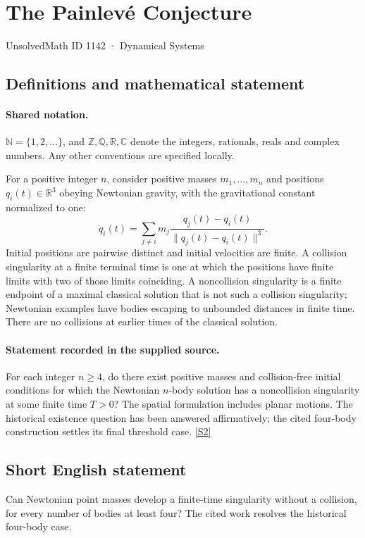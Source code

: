 \documentclass[11pt]{article}
\newcommand{\sref}[2]{\hyperlink{source:#1:#2}{[S#2]}}
\begin{document}
\setcounter{section}{1141}
\section{The Painlevé Conjecture}\label{1142}
{\small\sffamily UnsolvedMath ID 1142 · Dynamical Systems}
\subsection{Definitions and mathematical statement}

\paragraph{Shared notation.}$\mathbb N=\{1,2,\ldots\}$, and $\mathbb Z,\mathbb Q,\mathbb R,\mathbb C$ denote the integers, rationals, reals and complex numbers. Any other conventions are specified locally.


For a positive integer \(n\), consider positive masses
\(m_1,\ldots,m_n\) and positions \(q_i(t)\in\mathbb R^3\)
obeying Newtonian gravity, with the gravitational constant normalized to one:
\[
 \ddot q_i(t)=\sum_{j\ne i}m_j
      \frac{q_j(t)-q_i(t)}{\|q_j(t)-q_i(t)\|^3}.
\]
Initial positions are pairwise distinct and initial velocities are finite.
A collision singularity at a finite terminal time is one at which the
positions have finite limits with two of those limits coinciding.
A noncollision singularity is a finite endpoint of a maximal classical
solution that is not such a collision singularity; Newtonian examples
have bodies escaping to unbounded distances in finite time.
There are no collisions at earlier times of the classical solution.
\paragraph{Statement recorded in the supplied source.}
For each integer \(n\ge4\), do there exist positive masses and
collision-free initial conditions for which the Newtonian \(n\)-body
solution has a noncollision singularity at some finite time \(T>0\)?
The spatial formulation includes planar motions.
The historical existence question has been answered affirmatively;
the cited four-body construction settles its final threshold case. \sref{1142}{2}
\subsection{Short English statement}
Can Newtonian point masses develop a finite-time singularity without a collision, for every number of bodies at least four? The cited work resolves the historical four-body case.
\end{document}
